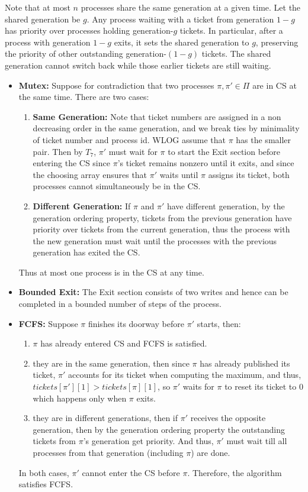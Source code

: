 \documentclass[12pt]{article}
\begin{document}
\begin{solution}
Note that at most $n$ processes share the same generation at a given time.
Let the shared generation be $g$. Any process waiting with a ticket from generation \(1-g\) has priority over processes holding generation-\(g\) tickets. In particular, after a process with generation \(1-g\) exits, it sets the shared generation to \(g\), preserving the priority of other outstanding generation-\((1-g)\) tickets. The shared generation cannot switch back while those earlier tickets are still waiting.
\begin{itemize}
    \item \textbf{Mutex:} Suppose for contradiction that two processes $\pi, \pi' \in \Pi$ are in CS at the same time. There are two cases: 
    \begin{enumerate}
        \item \textbf{Same Generation:} Note that ticket numbers are assigned in a non decreasing order in the same generation, and we break ties by minimality of ticket number and process id. WLOG assume that $\pi$ has the smaller pair. Then by $T_7$, $\pi'$ must wait for $\pi$ to start the Exit section before entering the CS since $\pi$'s ticket remains nonzero until it exits, and since the choosing array ensures that $\pi'$ waits until $\pi$ assigns its ticket, both processes cannot simultaneously be in the CS.
        \item \textbf{Different Generation:} If $\pi$ and $\pi'$ have different generation, by the generation ordering property, tickets from the previous generation have priority over tickets from the current generation, thus the process with the new generation must wait until the processes with the previous generation has exited the CS.
    \end{enumerate}
    Thus at most one process is in the CS at any time. 

    \item \textbf{Bounded Exit:} The Exit section consists of two writes and hence can be completed in a bounded number of steps of the process.
    
    \item \textbf{FCFS:} Suppose $\pi$ finishes its doorway before $\pi'$ starts, then:
    \begin{enumerate}
        \item $\pi$ has already entered CS and FCFS is satisfied. 
        \item they are in the same generation, then since \(\pi\) has already published its ticket, \(\pi'\) accounts for its ticket when computing the maximum, and thus, \(tickets{[\pi']}[1]> tickets[\pi][1]\), so \(\pi'\) waits for \(\pi\) to reset its ticket to $0$ which happens only when $\pi$ exits.
        \item they are in different generations, then if $\pi'$ receives the opposite generation, then by the generation ordering property the outstanding tickets from $\pi$'s generation get priority. And thus, \(\pi'\) must wait till all processes from that generation (including $\pi$) are done. 
    \end{enumerate}
    In both cases, \(\pi'\) cannot enter the CS before \(\pi\). Therefore, the algorithm satisfies FCFS.



\end{itemize}
\end{solution}
\end{document}
